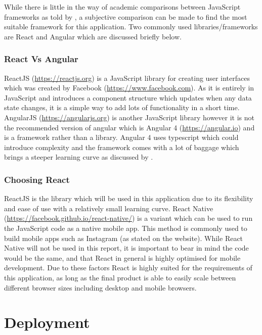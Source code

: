 \documentclass[a4paper,12pt]{report}
\begin{document}
      While there is little in the way of academic comparisons between JavaScript frameworks as told by \cite{graziotin2013making}, a subjective comparison can be made to find the most suitable framework for this application. Two commonly used libraries/frameworks are React and Angular which are discussed briefly below.

      \subsubsection{React Vs Angular}
        ReactJS (\url{https://reactjs.org}) is a JavaScript library for creating user interfaces which was created by Facebook (\url{https://www.facebook.com}). As it is entirely in JavaScript and introduces a component structure which updates when any data state changes, it is a simple way to add lots of functionality in a short time. AngularJS (\url{https://angularjs.org}) is another JavaScript library however it is not the recommended version of angular which is Angular 4 (\url{https://angular.io}) and is a framework rather than a library. Angular 4 uses typescript which could introduce complexity and the framework comes with a lot of baggage which brings a steeper learning curve as discussed by \cite{neuhaus_2017}.

      \subsubsection{Choosing React}
        ReactJS is the library which will be used in this application due to its flexibility and ease of use with a relatively small learning curve. React Native (\url{https://facebook.github.io/react-native/}) is a variant which can be used to run the JavaScript code as a native mobile app. This method is commonly used to build mobile apps such as Instagram (as stated on the website). While React Native will not be used in this report, it is important to bear in mind the code would be the same, and that React in general is highly optimised for mobile development. Due to these factors React is highly suited for the requirements of this application, as long as the final product is able to easily scale between different browser sizes including desktop and mobile browsers.

  \section{Deployment}
\end{document}

